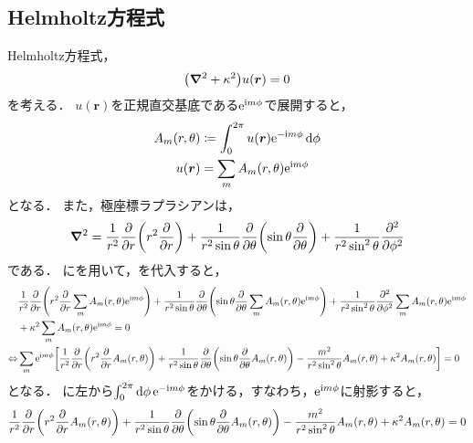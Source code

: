 \documentclass{report}
\begin{document}
  \subsection{Helmholtz方程式}
    Helmholtz方程式，
    \begin{align}
      \qty(\grad^2 + \kappa^2)u(\bm{r}) = 0\label{helmholtz-eq-wave}
    \end{align}
    を考える．
    $u(\bm{r})$を正規直交基底である$\mathrm{e}^{\mathrm{i} m\phi}$で展開すると，
    \begin{align}
      A_m(r, \theta) &\coloneqq \int_{0}^{2\pi}u(\bm{r})\mathrm{e}^{-\mathrm{i} m\phi}\dd{\phi} \\ 
      u(\bm{r}) &= \sum_{m}A_m(r, \theta)\mathrm{e}^{\mathrm{i} m\phi}\label{u-expand-with-a} \\ 
    \end{align}
    となる．
    また，極座標ラプラシアンは，
    \begin{align}
      \grad^2 = \frac{1}{r^2}\pdv{r}\qty(r^2\pdv{r}) + \frac{1}{r^2\sin\theta}\pdv{\theta}\qty(\sin\theta\pdv{\theta}) + \frac{1}{r^2\sin^2\theta}\pdv[2]{\phi} \label{polar-laplacian}
    \end{align}
    である．
    にを用いて，を代入すると，
    \begin{align}
      &\frac{1}{r^2}\pdv{r}\qty(r^2\pdv{r}\sum_{m}A_m(r, \theta)\mathrm{e}^{\mathrm{i} m\phi}) + \frac{1}{r^2\sin\theta}\pdv{\theta}\qty(\sin\theta\pdv{\theta}\sum_{m}A_m(r, \theta)\mathrm{e}^{\mathrm{i} m\phi}) + \frac{1}{r^2\sin^2\theta}\pdv[2]{\phi}\sum_{m}A_m(r, \theta)\mathrm{e}^{\mathrm{i} m\phi} \notag \\ 
      &+ \kappa^2\sum_{m}A_m(r, \theta)\mathrm{e}^{\mathrm{i} m\phi} = 0 \\ 
      \Leftrightarrow &\sum_{m}\mathrm{e}^{\mathrm{i} m\phi}\qty[
        \frac{1}{r^2}\pdv{r}\qty(r^2\pdv{r}A_m(r, \theta)) + 
        \frac{1}{r^2\sin\theta}\pdv{\theta}\qty(\sin\theta\pdv{\theta}A_m(r, \theta)) 
        - \frac{m^2}{r^2\sin^2\theta}A_m(r, \theta) + \kappa^2A_m(r, \theta)
      ] = 0 \label{am-before-int}
    \end{align}
    となる．
    に左から$\int_{0}^{2\pi}\dd{\phi}\mathrm{e}^{-\mathrm{i} m\phi}$をかける，すなわち，$\mathrm{e}^{\mathrm{i} m\phi}$に射影すると，
    \begin{align}
      \frac{1}{r^2}\pdv{r}\qty(r^2\pdv{r}A_m(r, \theta)) + \frac{1}{r^2\sin\theta}\pdv{\theta}\qty(\sin\theta\pdv{\theta}A_m(r, \theta)) - \frac{m^2}{r^2\sin^2\theta}A_m(r, \theta) + \kappa^2A_m(r, \theta) = 0 \label{a-condition}
    \end{align}
\end{document}
